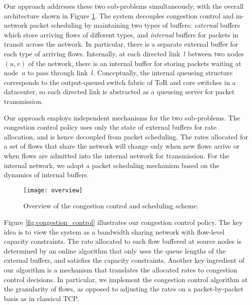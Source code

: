 \documentclass[ssy,preprint]{imsart_axv}
\numberwithin{equation}{section}
\theoremstyle{plain}
\theoremstyle{definition}
\theoremstyle{remark}
\theoremstyle{plain}
\theoremstyle{plain}
\begin{document}
Our approach addresses these two sub-problems simultaneously, with the overall architecture shown in Figure \ref{fig:Overview}. The system decouples congestion control and in-network packet scheduling by maintaining two types of buffers: \emph{external} buffers which store arriving flows of different types, and \emph{internal} buffers for packets in transit across the network. In particular, there is a separate external buffer for each type of arriving flows. Internally, at each directed link~$l$ between two nodes $(u,v)$ of the network, there is an internal buffer for storing packets waiting at node~$u$ to pass through link~$l$. Conceptually, the internal queueing structure 
corresponds to the output-queued switch fabric of ToR and core switches in a datacenter, so each directed link is abstracted as a queueing server for packet transmission. 


Our approach employs independent mechanisms for the two sub-problems. The congestion control policy uses only the state of external buffers for rate allocation, and is hence decoupled from packet scheduling. The rates allocated for a set of flows that share the network will change only when new flows arrive or when flows are admitted into the internal network for transmission. For the internal network, we adopt a packet scheduling mechanism based on the dynamics of internal buffers. 



\begin{figure}
	\centering{}\texttt{[image: overview]}\caption{Overview of the congestion control and scheduling scheme.\label{fig:Overview}}
\end{figure}



Figure \ref{fig:congestion_control} illustrates our congestion control policy. The key idea
is to view the system as a bandwidth sharing network with flow-level
capacity constraints. The rate allocated to each flow buffered at source nodes is determined by an online algorithm that only uses
the queue lengths of the external buffers, and satisfies the capacity constraints. Another key
ingredient of our algorithm is a mechanism that translates the allocated rates to congestion control decisions. In particular,
we implement the congestion control algorithm at the granularity of flows, as opposed
to adjusting the rates on a packet-by-packet basis as in classical
TCP. 
\end{document}
